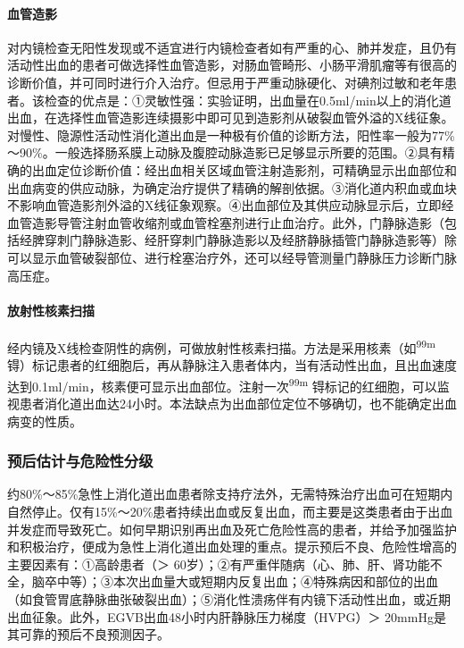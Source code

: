 \paragraph{血管造影}

对内镜检查无阳性发现或不适宜进行内镜检查者如有严重的心、肺并发症，且仍有活动性出血的患者可做选择性血管造影，对肠血管畸形、小肠平滑肌瘤等有很高的诊断价值，并可同时进行介入治疗。但忌用于严重动脉硬化、对碘剂过敏和老年患者。该检查的优点是：①灵敏性强：实验证明，出血量在0.5ml/min以上的消化道出血，在选择性血管造影连续摄影中即可见到造影剂从破裂血管外溢的X线征象。对慢性、隐源性活动性消化道出血是一种极有价值的诊断方法，阳性率一般为77\%～90\%。一般选择肠系膜上动脉及腹腔动脉造影已足够显示所要的范围。②具有精确的出血定位诊断价值：经出血相关区域血管注射造影剂，可精确显示出血部位和出血病变的供应动脉，为确定治疗提供了精确的解剖依据。③消化道内积血或血块不影响血管造影剂外溢的X线征象观察。④出血部位及其供应动脉显示后，立即经血管造影导管注射血管收缩剂或血管栓塞剂进行止血治疗。此外，门静脉造影（包括经脾穿刺门静脉造影、经肝穿刺门静脉造影以及经脐静脉插管门静脉造影等）除可以显示血管破裂部位、进行栓塞治疗外，还可以经导管测量门静脉压力诊断门脉高压症。

\paragraph{放射性核素扫描}

经内镜及X线检查阴性的病例，可做放射性核素扫描。方法是采用核素（如\textsuperscript{99m}
锝）标记患者的红细胞后，再从静脉注入患者体内，当有活动性出血，且出血速度达到0.1ml/min，核素便可显示出血部位。注射一次\textsuperscript{99m}
锝标记的红细胞，可以监视患者消化道出血达24小时。本法缺点为出血部位定位不够确切，也不能确定出血病变的性质。

\subsubsection{预后估计与危险性分级}

约80\%～85\%急性上消化道出血患者除支持疗法外，无需特殊治疗出血可在短期内自然停止。仅有15\%～20\%患者持续出血或反复出血，而主要是这类患者由于出血并发症而导致死亡。如何早期识别再出血及死亡危险性高的患者，并给予加强监护和积极治疗，便成为急性上消化道出血处理的重点。提示预后不良、危险性增高的主要因素有：①高龄患者（＞
60岁）；②有严重伴随病（心、肺、肝、肾功能不全，脑卒中等）；③本次出血量大或短期内反复出血；④特殊病因和部位的出血（如食管胃底静脉曲张破裂出血）；⑤消化性溃疡伴有内镜下活动性出血，或近期出血征象。此外，EGVB出血48小时内肝静脉压力梯度（HVPG）＞
20mmHg是其可靠的预后不良预测因子。

